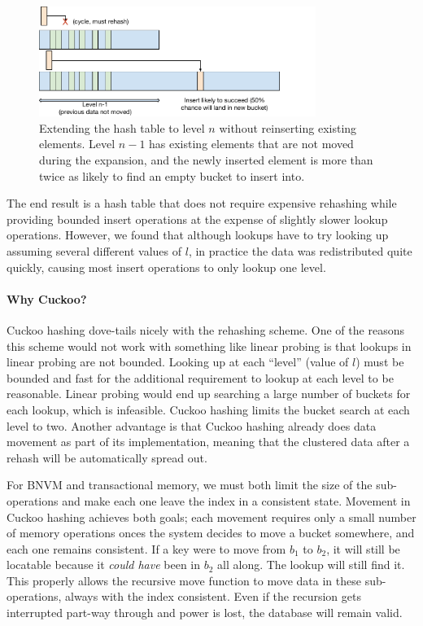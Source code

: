 \begin{figure}
\centering
\hspace*{1mm}
\includegraphics[width=90mm]{fig/cuckoo_rehash}
\caption{Extending the hash table to level $n$ without reinserting existing
elements. Level $n-1$ has existing elements that are not moved during the
expansion, and the newly inserted element is more than twice as likely to find
an empty bucket to insert into.}
\label{fig:rehash}
\end{figure}

The end result is a hash table that does not require expensive rehashing while
providing bounded insert operations at the expense of slightly slower lookup
operations. However, we found that although lookups have to try looking up
assuming several different values of $l$, in practice the data was redistributed
quite quickly, causing most insert operations to only lookup one level.


\paragraph{Why Cuckoo?}

Cuckoo hashing dove-tails nicely with the rehashing scheme. One of the reasons
this scheme would not work with something like linear probing is that lookups in
linear probing are not bounded. Looking up at each ``level'' (value of $l$) must
be bounded and fast for the additional requirement to lookup at each level to be
reasonable. Linear probing would end up searching a large number of buckets for
each lookup, which is infeasible. Cuckoo hashing limits the bucket search at
each level to two.
Another advantage is that Cuckoo hashing already does data movement as part of
its implementation, meaning that the clustered data after a rehash will be
automatically spread out. 


For BNVM and transactional memory, we must both limit the size of the
sub-operations and make each one leave the index in a consistent state. Movement
in Cuckoo hashing achieves both goals; each movement requires only a small
number of memory operations onces the system decides to move a bucket somewhere,
and each one remains consistent. If a key were to move from $b_1$ to $b_2$, it
will still be locatable because it \textit{could have} been in $b_2$ all along.
The lookup will still find it. This properly allows the recursive move function
to move data in these sub-operations, always with the index consistent. Even if
the recursion gets interrupted part-way through and power is lost, the database
will remain valid.





